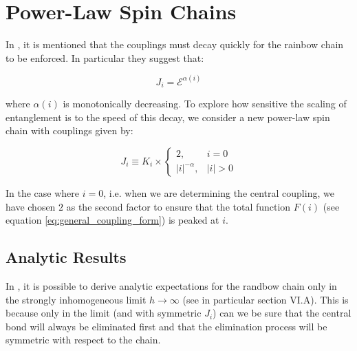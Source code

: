 
\section{Power-Law Spin Chains}\label{sec:powerbow_results}
In \cite{Vitagliano2010}, it is mentioned that the couplings must decay quickly for the rainbow chain to be enforced. In particular they suggest that: 

\begin{equation}
J_{i}=\mathcal{E}^{\alpha(i)}
\end{equation}

where $\alpha(i)$ is monotonically decreasing. To explore how sensitive the scaling of entanglement is to the speed of this decay, we consider a new power-law spin chain with couplings given by: 

\begin{equation}\label{eq:powerbow_couplings}
J_{i} \equiv K_{i} \times \begin{cases} 2, & i=0 \\ |i|^{-\alpha}, & |i|>0\end{cases}
\end{equation}

In the case where $i = 0$, i.e. when we are determining the central coupling, we have chosen $2$ as the second factor to ensure that the total function $F(i)$ (see equation \ref{eq:general_coupling_form}) is peaked at $i$. 


\subsection{Analytic Results	}\label{subsec:powerbow_analytical_results}
In \cite{paola2018}, it is possible to derive analytic expectations for the randbow chain only in the strongly inhomogeneous limit $h \to \infty$ (see in particular section VI.A). This is because only in the limit (and with symmetric $J_i$) can we be sure that the central bond will always be eliminated first and that the elimination process will be symmetric with respect to the chain.

